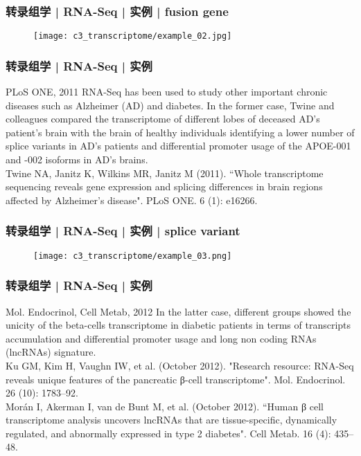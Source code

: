 \begin{frame}
  \frametitle{转录组学 | RNA-Seq | 实例 | fusion gene}
  \begin{figure}
    \centering
    \texttt{[image: c3\_transcriptome/example\_02.jpg]}
  \end{figure}
\end{frame}

\begin{frame}
  \frametitle{转录组学 | RNA-Seq | 实例}
  \begin{block}{PLoS ONE, 2011}
  RNA-Seq has been used to study other important chronic diseases such as Alzheimer (AD) and diabetes. In the former case, Twine and colleagues compared the transcriptome of different lobes of deceased AD's patient's brain with the brain of healthy individuals identifying a lower number of splice variants in AD's patients and differential promoter usage of the APOE-001 and -002 isoforms in AD's brains.\\
  \vspace{0.5em}
Twine NA, Janitz K, Wilkins MR, Janitz M (2011). ``Whole transcriptome sequencing reveals gene expression and splicing differences in brain regions affected by Alzheimer's disease". PLoS ONE. 6 (1): e16266. 
  \end{block}
\end{frame}

\begin{frame}
  \frametitle{转录组学 | RNA-Seq | 实例 | splice variant}
  \begin{figure}
    \centering
    \texttt{[image: c3\_transcriptome/example\_03.png]}
  \end{figure}
\end{frame}

\begin{frame}
  \frametitle{转录组学 | RNA-Seq | 实例}
  \begin{block}{Mol. Endocrinol, Cell Metab, 2012}
  In the latter case, different groups showed the unicity of the beta-cells transcriptome in diabetic patients in terms of transcripts accumulation and differential promoter usage and long non coding RNAs (lncRNAs) signature.\\
  \vspace{0.5em}
  Ku GM, Kim H, Vaughn IW, et al. (October 2012). "Research resource: RNA-Seq reveals unique features of the pancreatic β-cell transcriptome". Mol. Endocrinol. 26 (10): 1783–92.\\
  \vspace{0.5em}
  Morán I, Akerman I, van de Bunt M, et al. (October 2012). ``Human β cell transcriptome analysis uncovers lncRNAs that are tissue-specific, dynamically regulated, and abnormally expressed in type 2 diabetes". Cell Metab. 16 (4): 435–48. 
  \end{block}
\end{frame}


